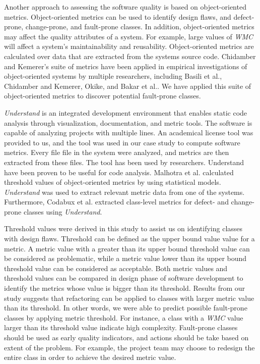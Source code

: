 Another approach to assessing the software quality is based on object-oriented metrics\cite{codabux2016technical}. Object-oriented metrics can be used to identify design flaws, and defect-prone, change-prone, and fault-prone classes\cite{basili1996validation}. In addition, object-oriented metrics may affect the quality attributes of a system. For example, large values of \textit{WMC} will affect a system's maintainability and reusability\cite{quenelobject}. Object-oriented metrics are calculated over data that are extracted from the systems source code. Chidamber and Kemerer's suite of metrics have been applied in empirical investigations of object-oriented systems by multiple researchers, including Basili et al.\cite{basili1996validation}, Chidamber and Kemerer\cite{chidamber1994metrics}, Okike\cite{okike2010pedagogical}, and Bakar et al.\cite{bakar2014analysis}. We have applied this suite of object-oriented metrics to discover potential fault-prone classes.

\textit{Understand} is an integrated development environment that enables static code analysis through visualization, documentation, and metric tools. The software is capable of analyzing projects with multiple lines. An academical license tool was provided to us, and the tool was used in our case study to compute software metrics. Every file file in the system were analyzed, and metrics are then extracted from these files. The tool has been used by researchers. Understand have been proven to be useful for code analysis. Malhotra et al.\cite{malhotra2015fault} calculated threshold values of object-oriented metrics by using statistical models. \textit{Understand} was used to extract relevant metric data from one of the systems. Furthermore, Codabux et al.\cite{codabux2016technical} extracted class-level metrics for defect- and change-prone classes using \textit{Understand}.

Threshold values were derived in this study to assist us on identifying classes with design flaws. Threshold can be defined as the upper bound value value for a metric. A metric value with a greater than its upper bound threshold value can be considered as problematic, while a metric value lower than its upper bound threshold value can be considered as acceptable. Both metric values and threshold values can be compared in design phase of software development to identify the metrics whose value is bigger than its threshold. Results from our study suggests that refactoring can be applied to classes with larger metric value than its threshold. In other words, we were able to predict possible fault-prone classes by applying metric threshold. For instance, a class with a \textit{WMC} value larger than its threshold value indicate high complexity. Fault-prone classes should be used as early quality indicators, and actions should be take based on extent of the problem. For example, the project team may choose to redesign the entire class in order to achieve the desired metric value. 


